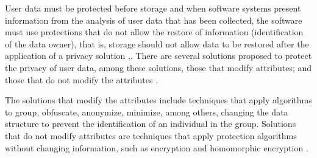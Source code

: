 \documentclass[conference]{IEEEtran}
\begin{document}
User data must be protected before storage and when software systems present information from the analysis of user data that has been collected, the software must use protections that do not allow the restore of information (identification of the data owner), that is, storage should not allow data to be restored after the application of a privacy solution \cite{Eu2019},\cite{leiLGPD}. There are several solutions proposed to protect the privacy of user data, among these solutions, those that modify attributes; and those that do not modify the attributes \cite{DBLP:journals/iotj/Vergara-Laurens17}.


The solutions that modify the attributes include techniques that apply algorithms to group, obfuscate, anonymize, minimize, among others, changing the data structure to prevent the identification of an individual in the group. Solutions that do not modify attributes are techniques that apply protection algorithms without changing information, such as encryption and homomorphic encryption  \cite{DBLP:journals/iotj/Vergara-Laurens17}.

\end{document}
